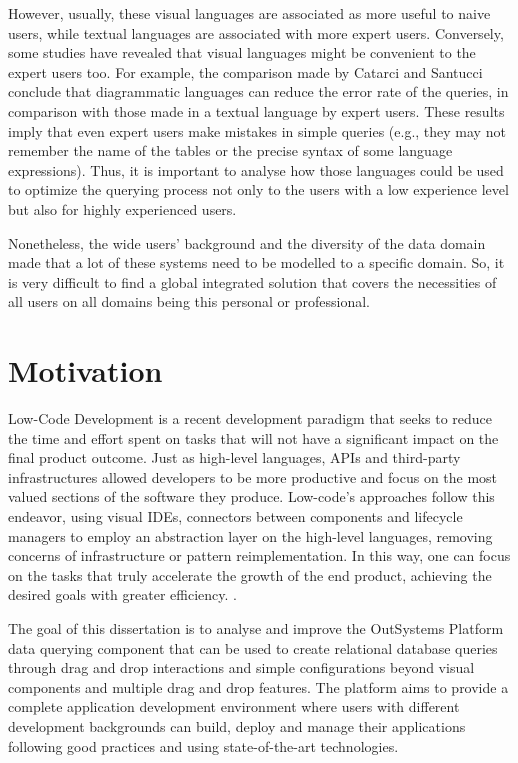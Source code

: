However, usually, these visual languages are associated as more useful to naive users, while textual languages are associated with more expert users.  Conversely, some studies have revealed that visual languages might be convenient to the expert users too. For example, the comparison made by Catarci and Santucci \cite{diagrammaticVsTextualQueryLanguages_aComparativeExperiment} conclude that diagrammatic languages can reduce the error rate of the queries, in comparison with those made in a textual language by expert users. These results imply that even expert users make mistakes in simple queries (e.g., they may not remember the name of the tables or the precise syntax of some language expressions). Thus, it is important to analyse how those languages could be used to optimize the querying process not only to the users with a low experience level but also for highly experienced users.

 Nonetheless, the wide users’ background and the diversity of the data domain made that a lot of these systems need to be modelled to a specific domain. So, it is very difficult to find a global integrated solution that covers the necessities of all users on all domains being this personal or professional.

\section{Motivation}
\label{sec:motivation}

Low-Code Development is a recent development paradigm that seeks to reduce the time and effort spent on tasks that will not have a significant impact on the final product outcome. Just as high-level languages, APIs and third-party infrastructures allowed developers to be more productive and focus on the most valued sections of the software they produce. Low-code’s approaches follow this endeavor, using visual IDEs, connectors between components and lifecycle managers to employ an abstraction layer on the high-level languages, removing concerns of infrastructure or pattern reimplementation. In this way, one can focus on the tasks that truly accelerate the growth of the end product, achieving the desired goals with greater efficiency. \cite{outsystems_whatIsLowCode}.

The goal of this dissertation is to analyse and improve the OutSystems Platform \cite{outsystemsPlatform} data querying component that can be used to create relational database queries through drag and drop interactions and simple configurations beyond visual components and multiple drag and drop features. The platform aims to provide a complete application development environment where users with different development backgrounds can build, deploy and manage their applications following good practices and using state-of-the-art technologies.

